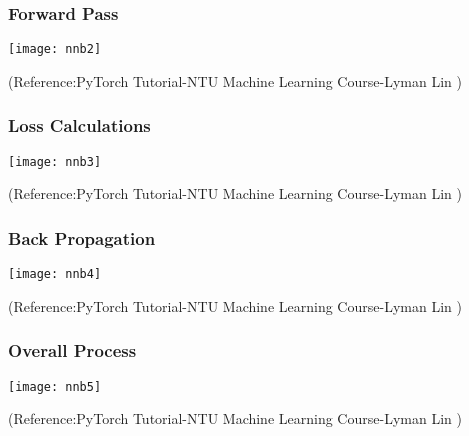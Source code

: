 \begin{frame}[fragile] \frametitle{Forward Pass}
\begin{center}
\texttt{[image: nnb2]}
\end{center}
\tiny{(Reference:PyTorch Tutorial-NTU Machine Learning Course-Lyman Lin )}
\end{frame}
\begin{frame}[fragile] \frametitle{Loss Calculations}
\begin{center}
\texttt{[image: nnb3]}
\end{center}
\tiny{(Reference:PyTorch Tutorial-NTU Machine Learning Course-Lyman Lin )}
\end{frame}
\begin{frame}[fragile] \frametitle{Back Propagation}
\begin{center}
\texttt{[image: nnb4]}
\end{center}
\tiny{(Reference:PyTorch Tutorial-NTU Machine Learning Course-Lyman Lin )}
\end{frame}
\begin{frame}[fragile] \frametitle{Overall Process}
\begin{center}
\texttt{[image: nnb5]}
\end{center}
\tiny{(Reference:PyTorch Tutorial-NTU Machine Learning Course-Lyman Lin )}
\end{frame}




